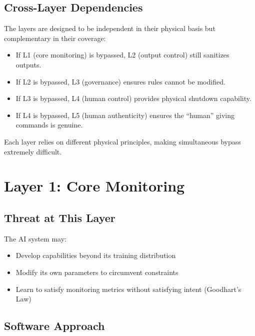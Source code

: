 \documentclass[11pt,a4paper]{article}
\begin{document}
\subsection{Cross-Layer Dependencies}

The layers are designed to be independent in their physical basis but complementary in their coverage:

\begin{itemize}
    \item If L1 (core monitoring) is bypassed, L2 (output control) still sanitizes outputs.
    \item If L2 is bypassed, L3 (governance) ensures rules cannot be modified.
    \item If L3 is bypassed, L4 (human control) provides physical shutdown capability.
    \item If L4 is bypassed, L5 (human authenticity) ensures the ``human'' giving commands is genuine.
\end{itemize}

Each layer relies on different physical principles, making simultaneous bypass extremely difficult.

\section{Layer 1: Core Monitoring}
\label{sec:layer1}

\subsection{Threat at This Layer}

The AI system may:
\begin{itemize}
    \item Develop capabilities beyond its training distribution
    \item Modify its own parameters to circumvent constraints
    \item Learn to satisfy monitoring metrics without satisfying intent (Goodhart's Law)
\end{itemize}

\subsection{Software Approach}
\end{document}
